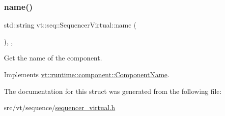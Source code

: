\subsubsection{\texorpdfstring{name()}{name()}}
{\footnotesize\ttfamily std\+::string vt\+::seq\+::\+Sequencer\+Virtual\+::name (\begin{DoxyParamCaption}{ }\end{DoxyParamCaption})\hspace{0.3cm}{\ttfamily [inline]}, {\ttfamily [override]}, {\ttfamily [virtual]}}



Get the name of the component. 



Implements \hyperlink{structvt_1_1runtime_1_1component_1_1_component_name_a33c06229bb605a2b2ceff68830d6d773}{vt\+::runtime\+::component\+::\+Component\+Name}.



The documentation for this struct was generated from the following file\+:\begin{DoxyCompactItemize}
\item 
src/vt/sequence/\hyperlink{sequencer__virtual_8h}{sequencer\+\_\+virtual.\+h}\end{DoxyCompactItemize}
